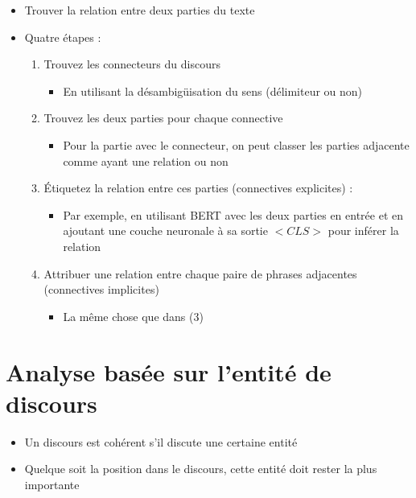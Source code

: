 \documentclass{KodeBook}
\begin{document}
\begin{itemize}
	\item Trouver la relation entre deux parties du texte
	\item Quatre étapes : 
	\begin{enumerate}
		\item Trouvez les connecteurs du discours
		\begin{itemize}
			\item En utilisant la désambigüisation du sens (délimiteur ou non)
		\end{itemize}
		\item Trouvez les deux parties pour chaque connective
		\begin{itemize}
			\item Pour la partie avec le connecteur, on peut classer les parties adjacente comme ayant une relation ou non
		\end{itemize}
		\item Étiquetez la relation entre ces parties (connectives explicites) : 
		\begin{itemize}
			\item Par exemple, en utilisant BERT avec les deux parties en entrée et en ajoutant une couche neuronale à sa sortie $ <CLS> $ pour inférer la relation
		\end{itemize}
		\item Attribuer une relation entre chaque paire de phrases adjacentes (connectives implicites)
		\begin{itemize}
			\item La même chose que dans (3)
		\end{itemize}
	\end{enumerate}
\end{itemize}


\section{Analyse basée sur l'entité de discours}

\begin{itemize}
	\item Un discours est cohérent s'il discute une certaine entité
	\item Quelque soit la position dans le discours, cette entité doit rester la plus importante
\end{itemize}
\end{document}

